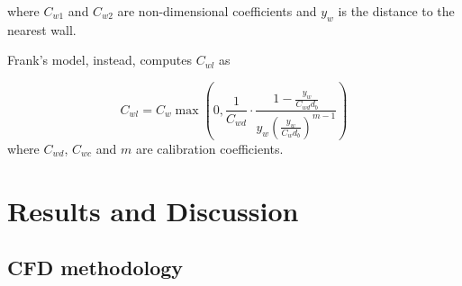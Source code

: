 \documentclass[11pt,a4paper]{article}
\begin{document}
where $C_{w 1}$ and $C_{w 2}$ are non-dimensional coefficients and $y_{w}$ is the distance to the nearest wall.

Frank's model, instead, computes $C_{w l}$ as

\begin{equation}
C_{w l}=C_{w} \max \left(0, \frac{1}{C_{w d}} \cdot \frac{1-\frac{y_{w}}{C_{w d} d_{b}}}{y_{w}\left(\frac{y_{w}}{C_{w} d_{b}}\right)^{m-1}}\right)
\end{equation}
where $C_{w d}$, $C_{w c}$ and $m$ are calibration coefficients.




\section{Results and Discussion}
\label{sec:results}



\subsection{CFD methodology}
\label{sub:methodology}
\end{document}

